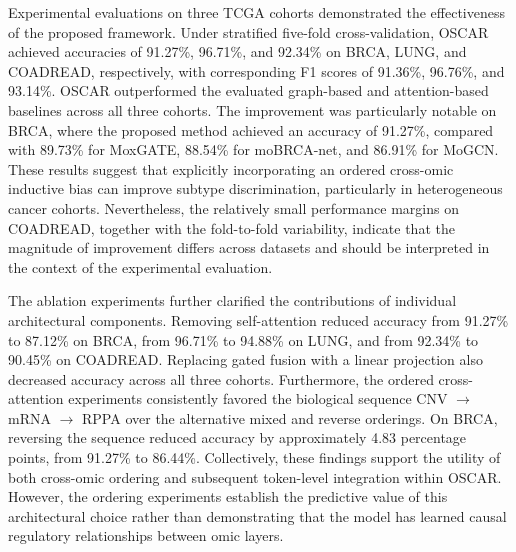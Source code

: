\documentclass[lettersize,journal]{IEEEtran}
\begin{document}
Experimental evaluations on three TCGA cohorts demonstrated the effectiveness of the proposed framework. Under stratified five-fold cross-validation, OSCAR achieved accuracies of 91.27\%, 96.71\%, and 92.34\% on BRCA, LUNG, and COADREAD, respectively, with corresponding F1 scores of 91.36\%, 96.76\%, and 93.14\%. OSCAR outperformed the evaluated graph-based and attention-based baselines across all three cohorts. The improvement was particularly notable on BRCA, where the proposed method achieved an accuracy of 91.27\%, compared with 89.73\% for MoxGATE, 88.54\% for moBRCA-net, and 86.91\% for MoGCN. These results suggest that explicitly incorporating an ordered cross-omic inductive bias can improve subtype discrimination, particularly in heterogeneous cancer cohorts. Nevertheless, the relatively small performance margins on COADREAD, together with the fold-to-fold variability, indicate that the magnitude of improvement differs across datasets and should be interpreted in the context of the experimental evaluation.

The ablation experiments further clarified the contributions of individual architectural components. Removing self-attention reduced accuracy from 91.27\% to 87.12\% on BRCA, from 96.71\% to 94.88\% on LUNG, and from 92.34\% to 90.45\% on COADREAD. Replacing gated fusion with a linear projection also decreased accuracy across all three cohorts. Furthermore, the ordered cross-attention experiments consistently favored the biological sequence CNV $\rightarrow$ mRNA $\rightarrow$ RPPA over the alternative mixed and reverse orderings. On BRCA, reversing the sequence reduced accuracy by approximately 4.83 percentage points, from 91.27\% to 86.44\%. Collectively, these findings support the utility of both cross-omic ordering and subsequent token-level integration within OSCAR. However, the ordering experiments establish the predictive value of this architectural choice rather than demonstrating that the model has learned causal regulatory relationships between omic layers.
\end{document}
